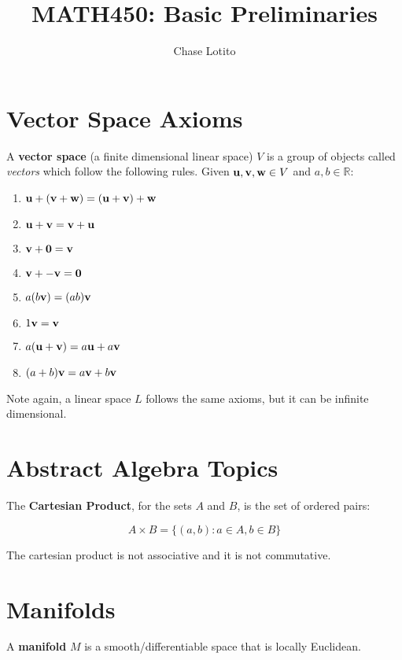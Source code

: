 \documentclass{article}
\title{MATH450: Basic Preliminaries}
\author{Chase Lotito}
\date{}
\begin{document}
\maketitle

\section*{Vector Space Axioms}

A \textbf{vector space} (a finite dimensional linear space) \(V\) is a group of objects called \textit{vectors} which follow the following rules. Given \(\vb{u}, \vb{v}, \vb{w} \in V\) and \(a,b \in \mathbb{R}\):

\begin{enumerate}
    \item \( \vb{u} + ( \vb{v} + \vb{w} ) = ( \vb{u} + \vb{v} ) + \vb{w} \)
    \item \( \vb{u} + \vb{v} = \vb{v} + \vb{u} \)
    \item \( \vb{v} + \vb{0} = \vb{v} \)
    \item \( \vb{v} + - \vb{v} = \vb{0} \)
    \item \( a(b\vb{v}) = (ab) \vb{v}  \)
    \item \( 1 \vb{v} = \vb{v}  \)
    \item \( a (\vb{u} + \vb{v}) = a\vb{u} +a\vb{v} \)
    \item \( (a + b) \vb{v} = a\vb{v} + b\vb{v} \)
\end{enumerate}

\noindent
Note again, a linear space \(L\) follows the same axioms, but it can be infinite dimensional.

\section*{Abstract Algebra Topics}

The \textbf{Cartesian Product}, for the sets \(A\) and \(B\), is the set of ordered pairs:

\begin{equation*}
    A \times B = \{ (a,b) : a \in A, b \in B  \}
\end{equation*}

\noindent
The cartesian product is not associative and it is not commutative.

\section*{Manifolds}

A \textbf{manifold} \(M\) is a smooth/differentiable space that is locally Euclidean.
\end{document}

